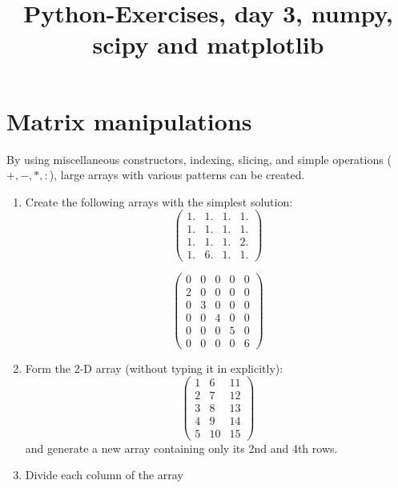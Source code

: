 \documentclass[smallheadings,12pt]{scrartcl}
\begin{document}
\parindent0cm
\pagestyle{myheadings}
\title{Python-Exercises, day 3, numpy, scipy and matplotlib }
\lstset{language=Python,numbers=left,frame=shadowbox}

\maketitle

\section*{Matrix manipulations}

By using miscellaneous constructors, indexing, slicing, and simple operations ($+, -, *, :$), large arrays with various patterns
can be created.
\begin{enumerate}
\item  Create the following arrays with the simplest solution:
\begin{equation}
\left(
  \begin{array}{ccccc}
 1.& 1.& 1.& 1.\\
 1.& 1.& 1.& 1.\\
 1.& 1.& 1.& 2.\\
 1.& 6.& 1.& 1.
\end{array}\right)
\end{equation}

\begin{equation}
\left(
  \begin{array}{cccccc}
 0& 0& 0& 0& 0\\
 2& 0& 0& 0& 0\\
 0& 3& 0& 0& 0\\
 0& 0& 4& 0& 0 \\
 0& 0& 0& 5& 0\\
 0& 0& 0& 0& 6
\end{array}\right)
\end{equation}

\item Form the 2-D array (without typing it in explicitly):
\begin{equation}
\left(
  \begin{array}{ccc}
    1&  6 &11\\
    2&  7 &12\\
    3&  8 &13\\
    4&  9 &14\\
    5& 10 &15
 \end{array}\right)
\end{equation}
    and generate a new array containing only its 2nd and 4th rows.
\item  Divide each column of the array


\end{enumerate}
\end{document}
